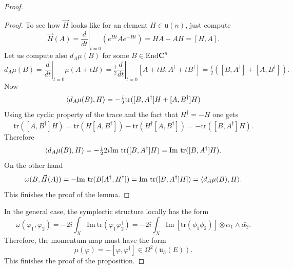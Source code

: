 \documentclass[12pt,a4paper]{book}
\theoremstyle{definition} \newtheorem{defn}[thm]{Definition}
\theoremstyle{definition} \newtheorem{ejemplo}[thm]{Example}
\theoremstyle{remark} \newtheorem{rem}[thm]{Remark}
\def\CC{\mathbf{C}}
\def\tr{\mathrm{tr}}
\def\End{\mathrm{End}}
\def\uu{\mathfrak{u}}
\DeclarePairedDelimiter\esc{\langle}{\rangle}
\begin{document}
\begin{proof}
\begin{proof}
	      To see how $\vec{H}$ looks like for an element $H\in \mathfrak{u}(n)$, just compute
	      \begin{equation*}
		\vec{H}(A)=\left.\frac{d}{dt} \right|_{t=0} (e^{Ht}Ae^{-Ht})=HA-AH=[H,A].
	      \end{equation*}
	      Let us compute also $d_{A}\mu(B)$ for some $B \in \End \CC^n$
	      \begin{equation*}
		d_A \mu(B) =\left.\frac{d}{dt} \right|_{t=0} \mu(A+tB)=\tfrac{i}{2}\left.\frac{d}{dt} \right|_{t=0}    [A+tB,A^{\dagger}+tB^\dagger]=\tfrac{i}{2} \left([B,A^{\dagger}] + [A,B^{\dagger}]\right).
	      \end{equation*}
	      Now
	      \begin{equation*}
		\esc{d_A\mu(B),H}=-\tfrac{i}{2} \tr([B,A^\dagger]H+[A,B^{\dagger}]H)
	      \end{equation*}
	      Using the cyclic property of the trace and the fact that $H^\dagger=-H$  one gets
	      \begin{equation*}
		\tr([A,B^\dagger]H)=\tr(H[A,B^\dagger])-\tr(H^\dagger[A,B^\dagger])=-\overline{\tr([B,A^\dagger]H)}.
	      \end{equation*}
Therefore
	      \begin{equation*}
		\esc{d_A\mu(B),H}=- \tfrac{i}{2}2i \mathrm{Im}\ \tr([B,A^\dagger]H)=  \mathrm{Im}\ \tr([B,A^\dagger]H).
	      \end{equation*}
	      On the other hand
	      \begin{equation*}
		\omega(B,\vec{H}(A))=-\mathrm{Im}\ \tr(B[A^\dagger,H^\dagger])=\mathrm{Im}\ \tr([B,A^\dagger]H])=\esc{d_A\mu(B),H}.
	      \end{equation*}
	      This finishes the proof of the lemma.
	    \end{proof}
	    In the general case, the symplectic structure locally has the form
	    \begin{equation*}
	    \omega(\varphi_1,\varphi_2)=-2i \int_X \mathrm{Im}\  \tr(\varphi_1\varphi_2^\dagger)=-2i \int_X \mathrm{Im}\ [\tr(\phi_1\phi_2^\dagger)] \otimes \alpha_1 \wedge \bar{\alpha_2}.
	    \end{equation*}
	    Therefore, the momentum map must have the form
	    \begin{equation*}
	      \mu(\varphi)=-[\varphi,\varphi^\dagger] \in \Omega^2(\uu_h(E)).
	    \end{equation*}
	    This finishes the proof of the proposition.
	  \end{proof}
\end{document}

